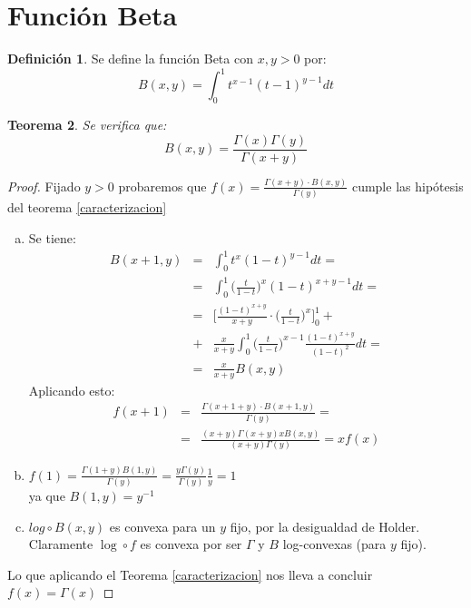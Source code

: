 \documentclass[a4paper, 11pt]{amsart}
\newtheorem{theorem}{Teorema}[section]
\theoremstyle{definition}
\newtheorem{definition}[theorem]{Definición}
\theoremstyle{remark}
\numberwithin{equation}{section}
\begin{document}
  \section{Función Beta}
  
  \begin{definition}
   Se define la función Beta con $x,y>0$ por:
   \begin{equation}
       B(x,y) = \int_0^1 {t^{x-1}(t-1)^{y-1}dt}
       \label{beta}
   \end{equation}
  \end{definition}

  
  \begin{theorem}
   Se verifica que:
    $$B(x,y) = \frac{\Gamma(x)\Gamma(y)}{\Gamma(x+y)}$$
   \end{theorem}
   
   \begin{proof}
    Fijado $y>0$ probaremos que $f(x) = \frac{\Gamma(x+y)\cdot B(x,y)}{\Gamma(y)}$ cumple las hipótesis del
    teorema \ref{caracterizacion}
    
    \begin{enumerate}[a)]
     \item Se tiene:
      \begin{eqnarray}
       B(x+1,y) &=& \int_0^1{t^x (1-t)^{y-1}dt} =\\ 	\nonumber
		&=& \int_0^1{\bigg(\frac{t}{1-t}\bigg)^x (1-t)^{x+y-1} dt} =\\	\nonumber
		&=& \bigg[\frac{(1-t)^{x+y}}{x+y}\cdot \bigg(\frac{t}{1-t}\bigg)^x\bigg]_0^1 +\\\nonumber
		&+& \frac{x}{x+y} \int_0^1{ \bigg(\frac{t}{1-t}\bigg)^{x-1} \frac{(1-t)^{x+y}}{(1-t)^2}dt}=\\		\nonumber       
		&=& \frac{x}{x+y}B(x,y)
      \end{eqnarray}
      Aplicando esto:
      \begin{eqnarray*}
      f(x+1) &=& \frac{\Gamma(x+1+y)\cdot B(x+1,y)}{\Gamma(y)} = \\
	     &=& \frac{(x+y)\Gamma(x+y)xB(x,y)}{(x+y)\Gamma(y)} = xf(x)
      \end{eqnarray*}
      
    \item $f(1) = \frac{\Gamma(1+y)B(1,y)}{\Gamma(y)} = \frac{y\Gamma(y)}{\Gamma(y)}\frac{1}{y} = 1$\\
    
      ya que $B(1,y) = y^{-1}$\\
      
    \item $log\circ B(x,y)$ es convexa para un $y$ fijo, por la desigualdad de Holder.\\
      Claramente $\log \circ f$ es convexa por ser $\Gamma$ y $B$ log-convexas (para $y$ fijo).
      
    \end{enumerate}
    \bigskip
    Lo que aplicando el Teorema \ref{caracterizacion} nos lleva a concluir $f(x) = \Gamma(x)$
   \end{proof}
   
\end{document}
